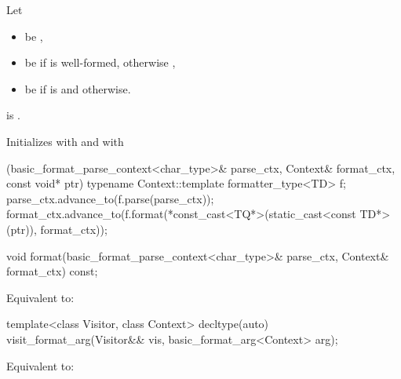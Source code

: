 \begin{itemdescr}
\pnum
Let
\begin{itemize}
\item
{} be ,
\item
{} be  if
 is well-formed, otherwise ,
\item
{} be  if  is 
and  otherwise.
\end{itemize}

\pnum
\mandates
{} is
.

\pnum
\effects
Initializes
 with  and
 with
\begin{codeblock}
[](basic_format_parse_context<char_type>& parse_ctx,
   Context& format_ctx, const void* ptr) {
  typename Context::template formatter_type<TD> f;
  parse_ctx.advance_to(f.parse(parse_ctx));
  format_ctx.advance_to(f.format(*const_cast<TQ*>(static_cast<const TD*>(ptr)),
                                 format_ctx));
}
\end{codeblock}
\end{itemdescr}

%
\begin{itemdecl}
void format(basic_format_parse_context<char_type>& parse_ctx, Context& format_ctx) const;
\end{itemdecl}

\begin{itemdescr}
\pnum
\effects
Equivalent to: 
\end{itemdescr}

%
\begin{itemdecl}
template<class Visitor, class Context>
  decltype(auto) visit_format_arg(Visitor&& vis, basic_format_arg<Context> arg);
\end{itemdecl}

\begin{itemdescr}
\pnum
\effects
Equivalent to: 
\end{itemdescr}

